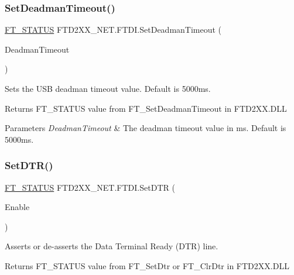 \subsubsection{\texorpdfstring{SetDeadmanTimeout()}{SetDeadmanTimeout()}}
{\footnotesize\ttfamily \mbox{\hyperlink{class_f_t_d2_x_x___n_e_t_1_1_f_t_d_i_aabe20ad905cc4ccc1e35dd5b877d9a83}{F\+T\+\_\+\+S\+T\+A\+T\+US}} F\+T\+D2\+X\+X\+\_\+\+N\+E\+T.\+F\+T\+D\+I.\+Set\+Deadman\+Timeout (\begin{DoxyParamCaption}\item[{U\+Int32}]{Deadman\+Timeout }\end{DoxyParamCaption})}



Sets the U\+SB deadman timeout value. Default is 5000ms. 

\begin{DoxyReturn}{Returns}
F\+T\+\_\+\+S\+T\+A\+T\+US value from F\+T\+\_\+\+Set\+Deadman\+Timeout in F\+T\+D2\+X\+X.\+D\+LL
\end{DoxyReturn}

\begin{DoxyParams}{Parameters}
{\em Deadman\+Timeout} & The deadman timeout value in ms. Default is 5000ms.\\
\hline
\end{DoxyParams}
\mbox{\label{class_f_t_d2_x_x___n_e_t_1_1_f_t_d_i_a2f10252f4a5bf95b7467e1fda5b35e7e}} 
\subsubsection{\texorpdfstring{SetDTR()}{SetDTR()}}
{\footnotesize\ttfamily \mbox{\hyperlink{class_f_t_d2_x_x___n_e_t_1_1_f_t_d_i_aabe20ad905cc4ccc1e35dd5b877d9a83}{F\+T\+\_\+\+S\+T\+A\+T\+US}} F\+T\+D2\+X\+X\+\_\+\+N\+E\+T.\+F\+T\+D\+I.\+Set\+D\+TR (\begin{DoxyParamCaption}\item[{bool}]{Enable }\end{DoxyParamCaption})}



Asserts or de-\/asserts the Data Terminal Ready (D\+TR) line. 

\begin{DoxyReturn}{Returns}
F\+T\+\_\+\+S\+T\+A\+T\+US value from F\+T\+\_\+\+Set\+Dtr or F\+T\+\_\+\+Clr\+Dtr in F\+T\+D2\+X\+X.\+D\+LL
\end{DoxyReturn}

